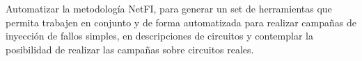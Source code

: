 Automatizar la metodología NetFI, para generar un set de herramientas que permita trabajen en conjunto y de forma automatizada para realizar campañas de inyección de fallos simples, en descripciones de circuitos y contemplar la posibilidad de realizar las campañas sobre circuitos reales.